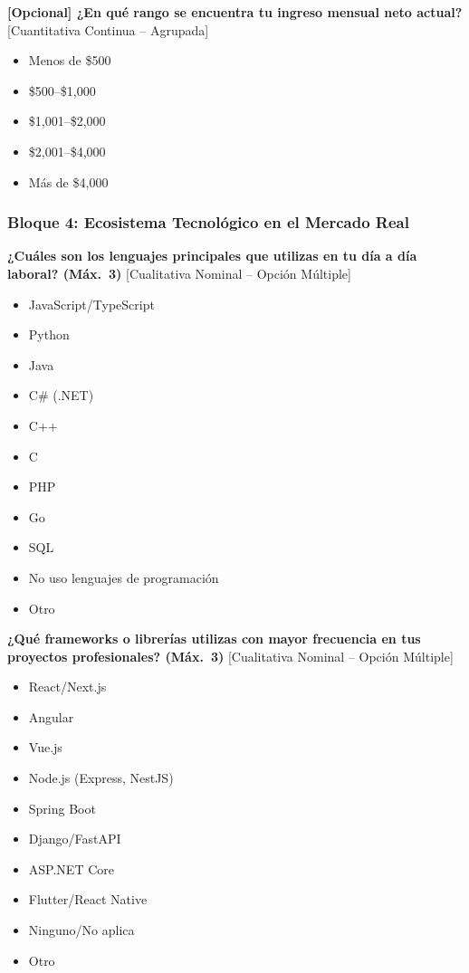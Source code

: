 \textbf{[Opcional] ¿En qué rango se encuentra tu ingreso mensual neto actual?} [Cuantitativa Continua -- Agrupada]

\begin{itemize}
    \item Menos de \$500
    \item \$500--\$1{,}000
    \item \$1{,}001--\$2{,}000
    \item \$2{,}001--\$4{,}000
    \item Más de \$4{,}000
\end{itemize}

\subsubsection*{Bloque 4: Ecosistema Tecnológico en el Mercado Real}

\textbf{¿Cuáles son los lenguajes principales que utilizas en tu día a día laboral? (Máx.~3)} [Cualitativa Nominal -- Opción Múltiple]

\begin{itemize}
    \item JavaScript/TypeScript
    \item Python
    \item Java
    \item C\# (.NET)
    \item C++
    \item C
    \item PHP
    \item Go
    \item SQL
    \item No uso lenguajes de programación
    \item Otro
\end{itemize}

\textbf{¿Qué frameworks o librerías utilizas con mayor frecuencia en tus proyectos profesionales? (Máx.~3)} [Cualitativa Nominal -- Opción Múltiple]

\begin{itemize}
    \item React/Next.js
    \item Angular
    \item Vue.js
    \item Node.js (Express, NestJS)
    \item Spring Boot
    \item Django/FastAPI
    \item ASP.NET Core
    \item Flutter/React Native
    \item Ninguno/No aplica
    \item Otro
\end{itemize}


